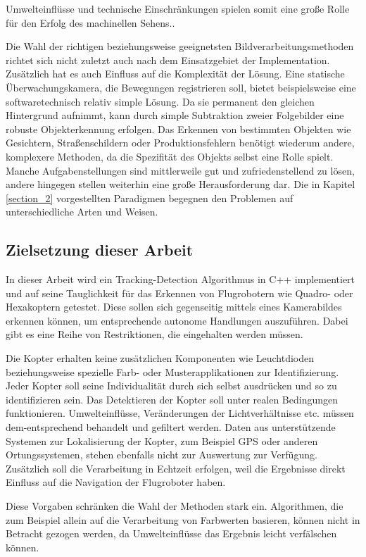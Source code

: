 Umwelteinflüsse und technische Einschränkungen spielen somit eine große Rolle für den Erfolg des machinellen Sehens.\cite{OTS}.

Die Wahl der richtigen beziehungsweise geeignetsten Bildverarbeitungsmethoden richtet sich nicht zuletzt auch nach dem Einsatzgebiet der Implementation. Zusätzlich hat es auch Einfluss auf die Komplexität der Lösung. Eine statische Überwachungskamera, die Bewegungen registrieren soll, bietet beispielsweise eine softwaretechnisch relativ simple Lösung. Da sie permanent den gleichen Hintergrund aufnimmt, kann durch simple Subtraktion zweier Folgebilder eine robuste Objekterkennung erfolgen. Das Erkennen von bestimmten Objekten wie Gesichtern, Straßenschildern oder Produktionsfehlern benötigt wiederum andere, komplexere Methoden, da die Spezifität des Objekts selbst eine Rolle spielt. Manche Aufgabenstellungen sind mittlerweile gut und zufriedenstellend zu lösen, andere hingegen stellen weiterhin eine große Herausforderung dar. Die in Kapitel \ref{section_2} vorgestellten Paradigmen begegnen den Problemen auf unterschiedliche Arten und Weisen.

\subsection{Zielsetzung dieser Arbeit}
In dieser Arbeit wird ein Tracking-Detection Algorithmus in C++ implementiert und auf seine Tauglichkeit für das Erkennen von Flugrobotern wie Quadro- oder Hexakoptern getestet. Diese sollen sich gegenseitig mittels eines Kamerabildes erkennen können, um entsprechende autonome Handlungen auszuführen. Dabei gibt es eine Reihe von Restriktionen, die eingehalten werden müssen.

Die Kopter erhalten keine zusätzlichen Komponenten wie Leuchtdioden beziehungsweise spezielle Farb- oder Musterapplikationen zur Identifizierung. Jeder Kopter soll seine Individualität durch sich selbst ausdrücken und so zu identifizieren sein. Das Detektieren der Kopter soll unter realen Bedingungen funktionieren. Umwelteinflüsse, Veränderungen der Lichtverhältnisse etc. müssen dem-entsprechend behandelt und gefiltert werden. Daten aus unterstützende Systemen zur Lokalisierung der Kopter, zum Beispiel GPS oder anderen Ortungssystemen, stehen ebenfalls nicht zur Auswertung zur Verfügung. Zusätzlich soll die Verarbeitung in Echtzeit erfolgen, weil die Ergebnisse direkt Einfluss auf die Navigation der Flugroboter haben.

Diese Vorgaben schränken die Wahl der Methoden stark ein. Algorithmen, die zum Beispiel allein auf die Verarbeitung von Farbwerten basieren, können nicht in Betracht gezogen werden, da Umwelteinflüsse das Ergebnis leicht verfälschen können.

